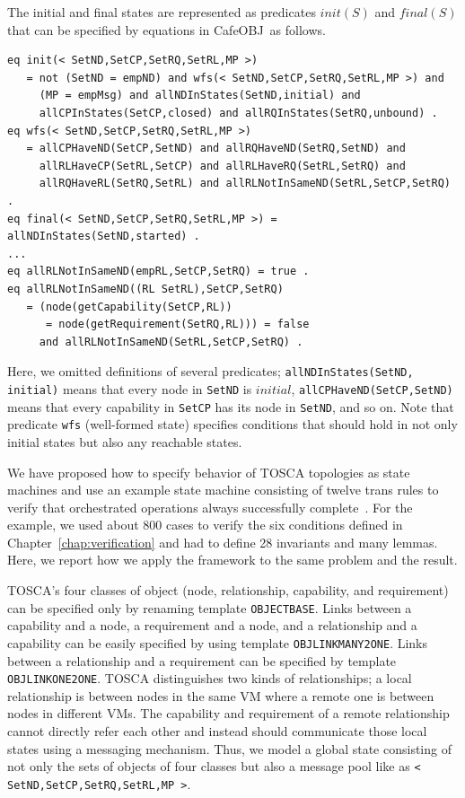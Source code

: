 \documentclass[12pt]{report}
\newcommand{\stt}[1]{{\small{\tt {#1}}}}
\newcommand{\cafeobj}{{\sf CafeOBJ}~}
\begin{document}
The initial and final states are represented as predicates $init(S)$
and $final(S)$ that can be specified by equations in \cafeobj as
follows.
\small
\begin{verbatim}
eq init(< SetND,SetCP,SetRQ,SetRL,MP >)
   = not (SetND = empND) and wfs(< SetND,SetCP,SetRQ,SetRL,MP >) and 
     (MP = empMsg) and allNDInStates(SetND,initial) and 
     allCPInStates(SetCP,closed) and allRQInStates(SetRQ,unbound) .
eq wfs(< SetND,SetCP,SetRQ,SetRL,MP >) 
   = allCPHaveND(SetCP,SetND) and allRQHaveND(SetRQ,SetND) and 
     allRLHaveCP(SetRL,SetCP) and allRLHaveRQ(SetRL,SetRQ) and 
     allRQHaveRL(SetRQ,SetRL) and allRLNotInSameND(SetRL,SetCP,SetRQ) .
eq final(< SetND,SetCP,SetRQ,SetRL,MP >) = allNDInStates(SetND,started) .
...
eq allRLNotInSameND(empRL,SetCP,SetRQ) = true .
eq allRLNotInSameND((RL SetRL),SetCP,SetRQ)
   = (node(getCapability(SetCP,RL)) 
      = node(getRequirement(SetRQ,RL))) = false
     and allRLNotInSameND(SetRL,SetCP,SetRQ) .
\end{verbatim}
\normalsize
Here, we omitted definitions of several predicates;
\stt{allNDInStates(SetND,} \stt{initial)} means that every node in
{\tt SetND} is $initial$, \stt{allCPHaveND(SetCP,SetND)} means that
every capability in {\tt SetCP} has its node in {\tt SetND}, and so on.  Note
that predicate {\tt wfs} (well-formed state) specifies conditions that
should hold in not only initial states but also any reachable states.


We have proposed how to specify behavior of TOSCA topologies as state
machines and use an example state machine consisting of twelve trans
rules to verify that orchestrated operations always successfully
complete~\cite{DBLP:conf/icfem/YoshidaOF15}. For the example, we used
about 800 cases to verify the six conditions defined in
Chapter~\ref{chap:verification} and had to define 28 invariants and
many lemmas.  Here, we report how we apply the framework to the same
problem and the result.

TOSCA's four classes of object (node, relationship, capability, and
requirement) can be specified only by renaming template
{\tt OBJECTBASE}.  Links between a capability and a node, a
requirement and a node, and a relationship and a capability can be
easily specified by using template {\tt OBJLINKMANY2ONE}. Links
between a relationship and a requirement can be specified by template
{\tt OBJLINKONE2ONE}.  TOSCA distinguishes two kinds of relationships;
a local relationship is between nodes in the same VM where a remote
one is between nodes in different VMs. The capability and requirement
of a remote relationship cannot directly refer each other and instead
should communicate those local states using a messaging
mechanism. Thus, we model a global state consisting of not only the
sets of objects of four classes but also a message pool like as \stt{<
  SetND,SetCP,SetRQ,SetRL,MP >}.
\end{document}
